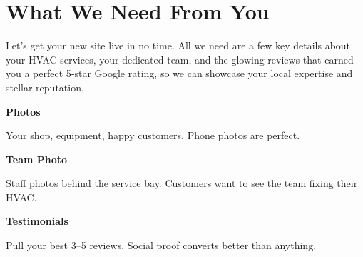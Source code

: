 \documentclass[11pt,letterpaper]{article}
\begin{document}
\vspace{0.2em}

\section*{What We Need From You}

Let’s get your new site live in no time. All we need are a few key details about your HVAC services, your dedicated team, and the glowing reviews that earned you a perfect 5‑star Google rating, so we can showcase your local expertise and stellar reputation.

\vspace{0.12em}

\noindent\begin{minipage}[t]{0.48\textwidth}
\begin{tcolorbox}[colframe=accent-teal, boxrule=1pt, left=0.7em, right=0.7em, top=0.5em, bottom=0.5em, arc=4pt, boxsep=0pt]
{\bfseries\small\color{accent-teal}Photos}

\vspace{0.15em}

{\small Your shop, equipment, happy customers. Phone photos are perfect.}
\end{tcolorbox}

\vspace{0.1em}

\begin{tcolorbox}[colframe=accent-teal, boxrule=1pt, left=0.7em, right=0.7em, top=0.5em, bottom=0.5em, arc=4pt, boxsep=0pt]
{\bfseries\small\color{accent-teal}Team Photo}

\vspace{0.15em}

{\small Staff photos behind the service bay. Customers want to see the team fixing their HVAC.}
\end{tcolorbox}

\vspace{0.1em}

\begin{tcolorbox}[colframe=accent-teal, boxrule=1pt, left=0.7em, right=0.7em, top=0.5em, bottom=0.5em, arc=4pt, boxsep=0pt]
{\bfseries\small\color{accent-teal}Testimonials}

\vspace{0.15em}

{\small Pull your best 3--5 reviews. Social proof converts better than anything.}
\end{tcolorbox}
\end{minipage}
\end{document}
